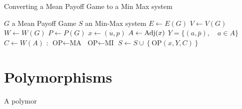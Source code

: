 \begin{algorithm}
	\caption{Converting a Mean Payoff Game to a Min Max system}\label{alg:MPGToMinMax}
	\begin{algorithmic}
		\Require $G$ a Mean Payoff Game
		\Ensure $S$ an Min-Max system 
		\State $E\leftarrow E(G)$ 
		\State $V\leftarrow V(G)$
		\State $W \leftarrow W(G)$ 
		\State $P \leftarrow P(G)$ 
			\State $x\leftarrow (u,p)$
			\State $A\leftarrow \operatorname{Adj}(x)$
			\State $Y=\{(a,\bar{p}),\quad a\in A\}$
			\State $C\leftarrow W(A)$ 
			:
				\State $\text{OP}\leftarrow \text{MA}$			
			\Else
				\State $\text{OP}\leftarrow \text{MI}$	
			\EndIf
			\State $S\leftarrow S\cup \left\{\text{OP}(x,Y,C)\right\}$
		\EndFor
	\end{algorithmic}
\end{algorithm}

\section{Polymorphisms}
A polymor
